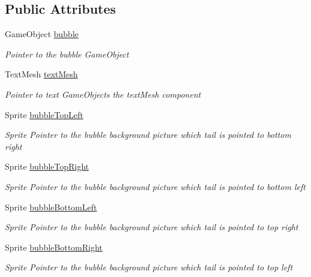 \subsection*{Public Attributes}
\begin{DoxyCompactItemize}
\item 
Game\+Object \hyperlink{class_bubble_manager_a695c03d55290b06d575b33ea6457881a}{bubble}
\begin{DoxyCompactList}\small\item\em Pointer to the bubble Game\+Object \end{DoxyCompactList}\item 
Text\+Mesh \hyperlink{class_bubble_manager_a527b93910188f40019b8a47717e004f7}{text\+Mesh}
\begin{DoxyCompactList}\small\item\em Pointer to text Game\+Object\textquotesingle{}s the text\+Mesh component \end{DoxyCompactList}\item 
Sprite \hyperlink{class_bubble_manager_a7fd323149c28ab5289e9292349f8f41e}{bubble\+Top\+Left}
\begin{DoxyCompactList}\small\item\em Sprite Pointer to the bubble background picture which tail is pointed to bottom right \end{DoxyCompactList}\item 
Sprite \hyperlink{class_bubble_manager_aa3b8d53f60bbba28edec8924ca5a1ee3}{bubble\+Top\+Right}
\begin{DoxyCompactList}\small\item\em Sprite Pointer to the bubble background picture which tail is pointed to bottom left \end{DoxyCompactList}\item 
Sprite \hyperlink{class_bubble_manager_a17c953ad296ced986643535f4a736cdd}{bubble\+Bottom\+Left}
\begin{DoxyCompactList}\small\item\em Sprite Pointer to the bubble background picture which tail is pointed to top right \end{DoxyCompactList}\item 
Sprite \hyperlink{class_bubble_manager_ab8f69b885d62fcb4411ccaeeed4617d9}{bubble\+Bottom\+Right}
\begin{DoxyCompactList}\small\item\em Sprite Pointer to the bubble background picture which tail is pointed to top left \end{DoxyCompactList}\end{DoxyCompactItemize}


